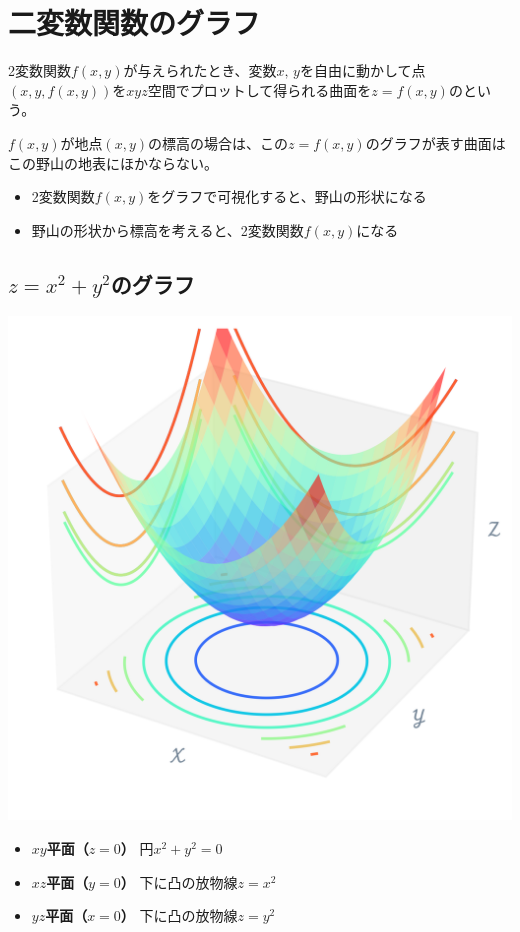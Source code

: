 \documentclass[../../../topic_multivariable-calculus]{subfiles}
\begin{document}
\sectionline
\section{二変数関数のグラフ}

2変数関数$f(x, y)$が与えられたとき、変数$x,\,y$を自由に動かして点$(x, y, f(x,y))$を$xyz$空間でプロットして得られる曲面を$z= f(x, y)$のという。

\br

$f(x,y)$が地点$(x, y)$の標高の場合は、この$z=f(x,y)$のグラフが表す曲面はこの野山の地表にほかならない。
\begin{itemize}
  \item 2変数関数$f(x, y)$をグラフで可視化すると、野山の形状になる
  \item 野山の形状から標高を考えると、2変数関数$f(x, y)$になる
\end{itemize}

\subsection{$z = x^2 + y^2$のグラフ}

\includegraphics[width=0.95\linewidth]{./python/graph_x-pow2-add-y-pow2_01.png}

\begin{itemize}
  \item {\bfseries $xy$平面（$z=0$）} 円$x^2 + y^2 =0$
  \item {\bfseries $xz$平面（$y=0$）} 下に凸の放物線$z=x^2$
  \item {\bfseries $yz$平面（$x=0$）} 下に凸の放物線$z=y^2$
\end{itemize}
\end{document}
